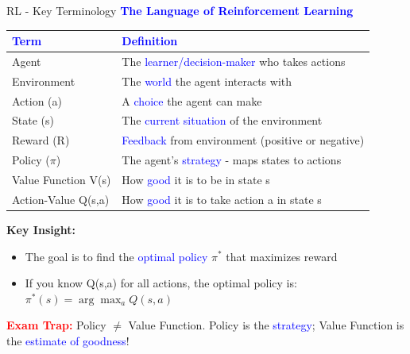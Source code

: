 \documentclass[8pt]{beamer}
\begin{document}
	\begin{frame}{RL - Key Terminology}
		\fontsize{6.5}{7.5}\selectfont
		\textcolor{blue}{\textbf{The Language of Reinforcement Learning}}
		
		\begin{tabular}{|p{2.5cm}|p{5.5cm}|}
			\hline
			\textcolor{blue}{Term} & \textcolor{blue}{Definition} \\
			\hline
			Agent & The \textcolor{blue}{learner/decision-maker} who takes actions \\
			\hline
			Environment & The \textcolor{blue}{world} the agent interacts with \\
			\hline
			Action (a) & A \textcolor{blue}{choice} the agent can make \\
			\hline
			State (s) & The \textcolor{blue}{current situation} of the environment \\
			\hline
			Reward (R) & \textcolor{blue}{Feedback} from environment (positive or negative) \\
			\hline
			Policy ($\pi$) & The agent's \textcolor{blue}{strategy} - maps states to actions \\
			\hline
			Value Function V(s) & How \textcolor{blue}{good} it is to be in state s \\
			\hline
			Action-Value Q(s,a) & How \textcolor{blue}{good} it is to take action a in state s \\
			\hline
		\end{tabular}
		
		\textbf{Key Insight:}
		\begin{itemize}
			\item The goal is to find the \textcolor{blue}{optimal policy} $\pi^*$ that maximizes reward
			\item If you know Q(s,a) for all actions, the optimal policy is: $\pi^*(s) = \arg\max_a Q(s,a)$
		\end{itemize}
		
		\textcolor{red}{\textbf{Exam Trap:}} Policy $\neq$ Value Function. Policy is the \textcolor{blue}{strategy}; Value Function is the \textcolor{blue}{estimate of goodness}!
	\end{frame}
	
\end{document}
